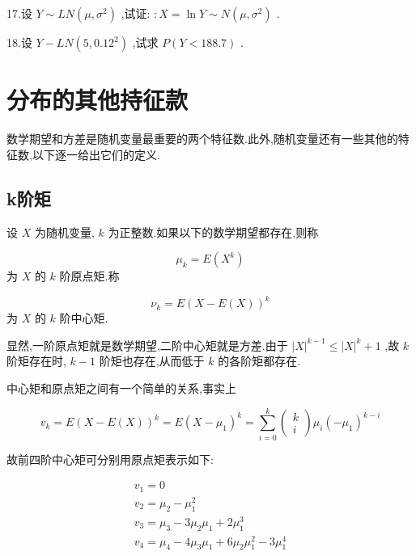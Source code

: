 17.设 $ Y \sim L N\left(\mu, \sigma^{2}\right) $ ,试证: $ : X=\ln Y \sim N\left(\mu, \sigma^{2}\right) $ .

18.设 $ Y-L N\left(5,0.12^{2}\right) $ ,试求 $ P(Y<188.7) $ .

\section{分布的其他持征款}

数学期望和方差是随机变量最重要的两个特征数.此外,随机变量还有一些其他的特征数,以下逐一给出它们的定义.

\subsection{k阶矩}

\begin{definition}{}{}
	设 $ X $ 为随机变量, $ k $ 为正整数.如果以下的数学期望都存在,则称
	
	\begin{equation}
	\mu_{k}=E\left(X^{k}\right) \label{eq:2.7.1}
	\end{equation}
	为 $ X $ 的 $ k $ 阶原点矩.称
	
	\begin{equation}
	\nu_{k}=E(X-E(X))^{k} \label{eq:2.7.2}
	\end{equation}
	为 $ X $ 的 $ k $ 阶中心矩.
\end{definition}


显然,一阶原点矩就是数学期望,二阶中心矩就是方差.由于 $ |X|^{k-1} \leqslant |X|^{k}+1 $ ,故 $ k $ 阶矩存在时, $ k-1 $ 阶矩也存在,从而低于 $ k $ 的各阶矩都存在.

中心矩和原点矩之间有一个简单的关系,事实上

\[
v_{k}=E(X-E(X))^{k}=E\left(X-\mu_{1}\right)^{k}=\sum_{i=0}^{k} \left( \begin{array}{l}{k} \\ {i}\end{array}\right) \mu_{i}\left(-\mu_{1}\right)^{k-i}
\]

故前四阶中心矩可分别用原点矩表示如下:

\[
\begin{array}{l}{v_{1}=0} \\ {v_{2}=\mu_{2}-\mu_{1}^{2}} \\ {v_{3}=\mu_{3}-3 \mu_{2} \mu_{1}+2 \mu_{1}^{3}} \\ {v_{4}=\mu_{4}-4 \mu_{3} \mu_{1}+6 \mu_{2} \mu_{1}^{2}-3 \mu_{1}^{4}}\end{array}
\]


